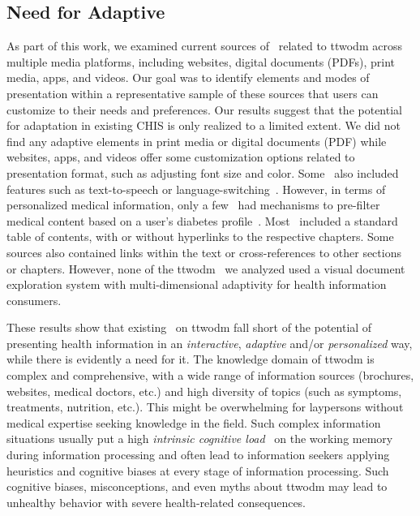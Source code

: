 \subsection{Need for Adaptive \chis} \label{subsec:chis}

As part of this work, we examined current sources of \chis\ related to \acrshort{ttwodm} across multiple media platforms, including websites, digital documents (PDFs), print media, apps, and videos. Our goal was to identify elements and modes of presentation within a representative sample of these sources that users can customize to their needs and preferences.
%
Our results suggest that the potential for adaptation in existing CHIS is only realized to a limited extent.
%
We did not find any adaptive elements in print media or digital documents (PDF) while websites, apps, and videos offer some customization options related to presentation format, such as adjusting font size and color. 
%
Some \chis\ also included features such as text-to-speech or language-switching~\cite{RN7, RN8}.
%
However, in terms of personalized medical information, only a few \chis\ had mechanisms to pre-filter medical content based on a user's diabetes profile~\cite{RN9}.
%
Most \chis\ included a standard table of contents, with or without hyperlinks to the respective chapters. Some sources also contained links within the text or cross-references to other sections or chapters. 
%
However, none of the \acrshort{ttwodm} \chis\ we analyzed used a visual document exploration system with multi-dimensional adaptivity for health information consumers.



These results show that existing \chis\ on \acrshort{ttwodm} fall short of the potential of presenting health information in an \emph{interactive}, \emph{adaptive} and/or \emph{personalized} way, while there is evidently a need for it. 
%
The knowledge domain of \acrshort{ttwodm} is complex and comprehensive, with a wide range of information sources (brochures, websites, medical doctors, etc.) and high diversity of topics (such as symptoms, treatments, nutrition, etc.). 
%
This might be overwhelming for laypersons without medical expertise seeking knowledge in the field. Such complex information situations usually put a high \emph{intrinsic cognitive load}~\cite{sweller2005implications} on the working memory during information processing and often lead to information seekers applying heuristics and cognitive biases at every stage of information processing. 
%
Such cognitive biases, misconceptions, and even myths about \acrshort{ttwodm} may lead to unhealthy behavior with severe health-related consequences. 


